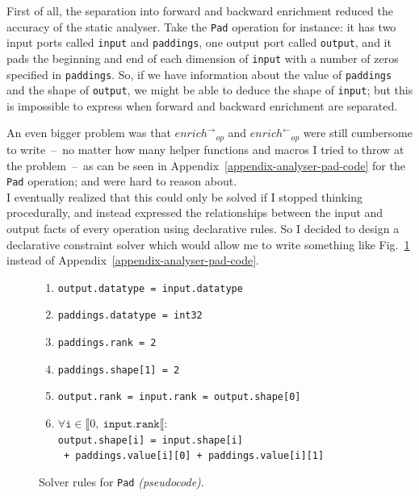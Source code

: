 \documentclass[11pt]{article}
\begin{document}
First of all, the separation into forward and backward enrichment reduced the accuracy of the static analyser. Take the \texttt{Pad} operation \cite{tensorflow-pad} for instance: it has two input ports called \texttt{input} and \texttt{paddings}, one output port called \texttt{output}, and it pads the beginning and end of each dimension of \texttt{input} with a number of zeros specified in \texttt{paddings}. So, if we have information about the value of \texttt{paddings} and the shape of \texttt{output}, we might be able to deduce the shape of \texttt{input}; but this is impossible to express when forward and backward enrichment are separated.

An even bigger problem was that ${enrich^\rightarrow}_{op}$ and ${enrich^\leftarrow}_{op}$ were still cumbersome to write~--~no matter how many helper functions and macros I tried to throw at the problem~--~as can be seen in Appendix~\ref{appendix-analyser-pad-code} for the \texttt{Pad} operation; and were hard to reason about.\\

I eventually realized that this could only be solved if I stopped thinking procedurally, and instead expressed the relationships between the input and output facts of every operation using declarative rules. So I decided to design a declarative constraint solver which would allow me to write something like Fig.~\ref{fig-analyser-pad-pseudorules} instead of Appendix~\ref{appendix-analyser-pad-code}.\\

\begin{figure}[!h]
\centering
    \caption{Solver rules for \texttt{Pad} \textit{(pseudocode)}.}
    \label{fig-analyser-pad-pseudorules}
    \vspace{-1em}
    \begin{enumerate}[noitemsep]
        \item \texttt{output.datatype = input.datatype}
        \item \texttt{paddings.datatype = int32}
        \item \texttt{paddings.rank = 2}
        \item \texttt{paddings.shape[1] = 2}
        \item \texttt{output.rank = input.rank = output.shape[0]}
        \item $\forall \texttt{i} \in \llbracket 0,\ \texttt{input.rank} \llbracket \texttt{:}$\\
        \quad\texttt{output.shape[i] = input.shape[i]}\\
        \qquad\qquad\qquad\qquad\quad\texttt{  + paddings.value[i][0] + paddings.value[i][1]}\\
    \end{enumerate}
\end{figure}
\end{document}
